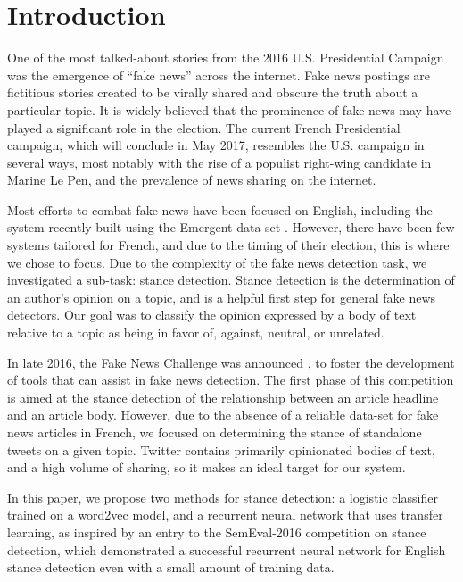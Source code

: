 \documentclass[journal]{IEEEtran}
\begin{document}
\section{Introduction}
One of the most talked-about stories from the 2016 U.S. Presidential Campaign was the emergence of “fake news” across the internet. Fake news postings are fictitious stories created to be virally shared and obscure the truth about a particular topic. It is widely believed that the prominence of fake news may have played a significant role in the election. The current French Presidential campaign, which will conclude in May 2017, resembles the U.S. campaign in several ways, most notably with the rise of a populist right-wing candidate in Marine Le Pen, and the prevalence of news sharing on the internet. 

Most efforts to combat fake news have been focused on English, including the system recently built using the Emergent data-set \cite{ferreira_vlachos_2016}. However, there have been few systems tailored for French, and due to the timing of their election, this is where we chose to focus. Due to the complexity of the fake news detection task, we investigated a sub-task: stance detection. Stance detection is the determination of an author’s opinion on a topic, and is a helpful first step for general fake news detectors. Our goal was to classify the opinion expressed by a body of text relative to a topic as being in favor of, against, neutral, or unrelated.

In late 2016, the Fake News Challenge was announced \cite{fake_news_challenge}, to foster the development of tools that can assist in fake news detection. The first phase of this competition is aimed at the stance detection of the relationship between an article headline and an article body. However, due to the absence of a reliable data-set for fake news articles in French, we focused on determining the stance of standalone tweets on a given topic. Twitter contains primarily opinionated bodies of text, and a high volume of sharing, so it makes an ideal target for our system. 

In this paper, we propose two methods for stance detection: a logistic classifier trained on a word2vec model, and a recurrent neural network that uses transfer learning, as inspired by an entry \cite{DBLP:journals/corr/ZarrellaM16} to the SemEval-2016 competition on stance detection, which demonstrated a successful recurrent neural network for English stance detection even with a small amount of training data.
\end{document}
